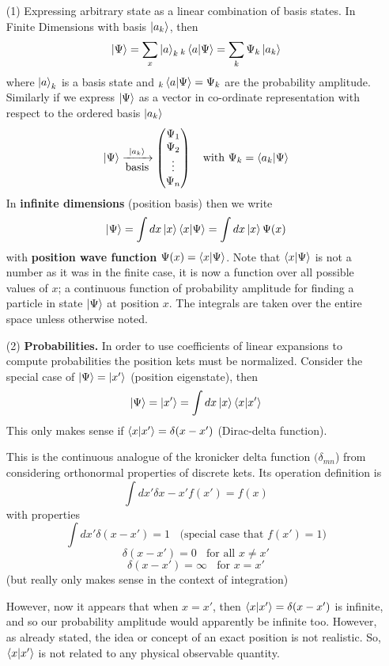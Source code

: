 \documentclass[english, 11pt]{article}
\begin{document}
    \begin{itemize}
      \item[(1)] Expressing arbitrary state as a linear combination of basis states. In Finite Dimensions with basis $\left|a_k\right\rangle$, then
      \[ \kpsi = \sum_x \ket{a}_k{}_k\braket{a}{\Psi} = \sum_k \Psi_k \ket{a_k} \]
      where $\left|a\right\rangle_k$ is a basis state and ${}_k\braket{a}{\Psi} = \Psi_k$ are the probability amplitude. Similarly if we express $\left|\Psi\right\rangle$ as a vector in co-ordinate representation with respect to the ordered basis $\left|a_k\right\rangle$
      \[ \kpsi  \xrightarrow[\mbox{basis}]{\ket{a_k}} \mtx{\Psi_1\\\Psi_2\\\vdots\\\Psi_n} \ \ \ \mbox{with } \Psi_k = \braket{a_k}{\Psi} \]
      In \textbf{infinite dimensions} (position basis) then we write
      \[ \kpsi = \int dx \kx \braket{x}{\Psi} = \int dx \kx\Psi(x) \]
      with \textbf{position wave function} $\Psi(x) = \braket{x}{\Psi}$. Note that $\braket{x}{\Psi}$ is not a number as it was in the finite case, it is now a function over all possible values of $x$; a continuous function of probability amplitude for finding a particle in state $\left|\Psi\right\rangle$ at position $x$. The integrals are taken over the entire space unless otherwise noted.

      \item[(2)] \textbf{Probabilities.} In order to use coefficients of linear expansions to compute probabilities the position kets must be normalized. Consider the special case of $\left|\Psi\right\rangle = \left|x'\right\rangle$ (position eigenstate), then
      \[ \kpsi = \ket{x'} = \int dx \kx\braket{x}{x'} \]
      This only makes sense if $\braket{x}{x'} = \delta(x-x')$ (Dirac-delta function).
      \begin{defn}\label{Dirac-delta function}
        This is the continuous analogue of the kronicker delta function $(\delta_{mn}$) from considering orthonormal properties of discrete kets. Its operation definition is
        \[ \int dx' \delta{x-x'}f(x') = f(x) \]
        with properties
        \[ \int dx' \delta(x-x') = 1 \ \ \ \ \mbox{(special case that $f(x') = 1$)} \]
        \[ \delta(x-x') = 0 \ \ \ \ \mbox{for all $x \not = x'$} \]
        \[ \delta(x-x') = \infty \ \ \ \ \mbox{for $x = x'$} \]
        (but really only makes sense in the context of integration)
      \end{defn}
      However, now it appears that when $x = x'$, then $\braket{x}{x'} = \delta(x-x')$ is infinite, and so our probability amplitude would apparently be infinite too. However, as already stated, the idea or concept of an exact position is not realistic. So, $\braket{x}{x'}$ is not related to any physical observable quantity.
      \newline


\end{itemize}
\end{document}

